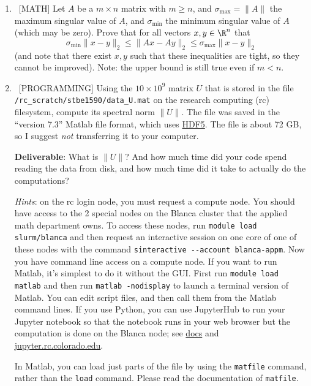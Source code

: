 \documentclass[10pt, letterpaper]{scrartcl}
\begin{document}
\begin{enumerate}[align=left, leftmargin=*, label=\bfseries Problem \arabic*:]   
 
    \item \ [MATH] Let $A$ be a $m \times n$ matrix with $m\ge n$, and $\sigma_{\max} = \|A\|$ the maximum singular value of $A$, and $\sigma_{\min}$ the minimum singular value of $A$ (which may be zero).  Prove that for all vectors $x,y\in \R^n$ that 
    \[
    \sigma_{\min} \| x-y\|_2 \le \|Ax-Ay\|_2 \le \sigma_{\max}\|x-y\|_2
    \]
    (and note that there exist $x,y$ such that these inequalities are tight, so they cannot be improved). Note: the upper bound is still true even if $m < n$.
         
    \item \ [PROGRAMMING] Using the $10 \times 10^9$ matrix $U$ that is stored in the file \\ \texttt{/rc\_scratch/stbe1590/data\_U.mat} on the research computing (rc) filesystem, compute its spectral norm $\|U\|$.
    The file was saved in the ``version 7.3'' Matlab file format, which uses \href{https://www.hdfgroup.org/}{HDF5}.  The file is about 72 GB, so I suggest \emph{not} transferring it to your computer.

    \textbf{Deliverable}: What is $\|U\|$? And how much time did your code spend reading the data from disk, and how much time did it take to actually do the computations?
    
    \emph{Hints}: on the rc login node, you must request a compute node. You should have access to the 2 special nodes on the Blanca cluster that the applied math department owns. To access these nodes, run \texttt{module load slurm/blanca} and then request an interactive session on one core of one of these nodes with the command \texttt{sinteractive -{}-account blanca-appm}.  Now you have command line access on a compute node.  If you want to run Matlab, it's simplest to do it without the GUI.  First run \texttt{module load matlab} and then run \texttt{matlab -nodisplay} to launch a terminal version of Matlab. You can edit script files, and then call them from the Matlab command lines.  If you use Python, you can use JupyterHub to run your Jupyter notebook so that the notebook runs in your web browser but the computation is done on the Blanca node; see \href{https://curc.readthedocs.io/en/latest/gateways/jupyterhub.html}{docs} and \href{https://jupyter.rc.colorado.edu/}{jupyter.rc.colorado.edu}.
    
    
    In Matlab, you can load just parts of the file by using the \texttt{matfile} command, rather than the \texttt{load} command. Please read the documentation of \texttt{matfile}.
    

\end{enumerate}
\end{document}
